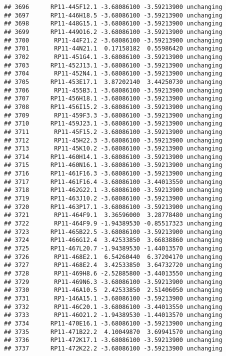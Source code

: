 \documentclass[]{article}
\begin{document}
\begin{verbatim}
## 3696      RP11-445F12.1 -3.68086100 -3.59213900 unchanging
## 3697      RP11-446H18.5 -3.68086100 -3.59213900 unchanging
## 3698      RP11-448G15.1 -3.68086100 -3.59213900 unchanging
## 3699      RP11-449O16.2 -3.68086100 -3.59213900 unchanging
## 3700       RP11-44F21.2 -3.68086100 -3.59213900 unchanging
## 3701       RP11-44N21.1  0.17158182  0.55986420 unchanging
## 3702       RP11-451G4.1 -3.68086100 -3.59213900 unchanging
## 3703      RP11-452J13.1 -3.68086100 -3.59213900 unchanging
## 3704       RP11-452N4.1 -3.68086100 -3.59213900 unchanging
## 3705      RP11-453E17.1  3.87202140  3.44250730 unchanging
## 3706       RP11-455B3.1 -3.68086100 -3.59213900 unchanging
## 3707      RP11-456H18.1 -3.68086100 -3.59213900 unchanging
## 3708      RP11-456I15.2 -3.68086100 -3.59213900 unchanging
## 3709       RP11-459F3.3 -3.68086100 -3.59213900 unchanging
## 3710      RP11-459J23.1 -3.68086100 -3.59213900 unchanging
## 3711       RP11-45F15.2 -3.68086100 -3.59213900 unchanging
## 3712       RP11-45H22.3 -3.68086100 -3.59213900 unchanging
## 3713       RP11-45K10.2 -3.68086100 -3.59213900 unchanging
## 3714      RP11-460H14.1 -3.68086100 -3.59213900 unchanging
## 3715      RP11-460N16.1 -3.68086100 -3.59213900 unchanging
## 3716      RP11-461F16.3 -3.68086100 -3.59213900 unchanging
## 3717      RP11-461F16.4 -3.68086100 -3.44013550 unchanging
## 3718      RP11-462G22.1 -3.68086100 -3.59213900 unchanging
## 3719      RP11-463J10.2 -3.68086100 -3.59213900 unchanging
## 3720      RP11-463P17.1 -3.68086100 -3.59213900 unchanging
## 3721       RP11-464F9.1  3.36596000  3.28778480 unchanging
## 3722       RP11-464F9.9 -1.94389530 -0.85517323 unchanging
## 3723      RP11-465B22.5 -3.68086100 -3.59213900 unchanging
## 3724      RP11-466G12.4  3.42533850  3.66838860 unchanging
## 3725      RP11-467L20.7 -1.94389530 -1.44013570 unchanging
## 3726       RP11-468E2.1  6.54260440  6.37204170 unchanging
## 3727       RP11-468E2.4  3.42533850  3.64732720 unchanging
## 3728       RP11-469H8.6 -2.52885800 -3.44013550 unchanging
## 3729       RP11-469N6.3 -3.68086100 -3.59213900 unchanging
## 3730       RP11-46A10.5  2.42533850  2.51406050 unchanging
## 3731       RP1-146A15.1 -3.68086100 -3.59213900 unchanging
## 3732       RP11-46C20.1 -3.68086100 -3.44013550 unchanging
## 3733       RP11-46O21.2 -1.94389530 -1.44013570 unchanging
## 3734      RP11-470E16.1 -3.68086100 -3.59213900 unchanging
## 3735      RP11-471B22.2  4.10049870  3.69941570 unchanging
## 3736      RP11-472K17.1 -3.68086100 -3.59213900 unchanging
## 3737      RP11-472K22.2 -3.68086100 -3.59213900 unchanging

\end{verbatim}
\end{document}
